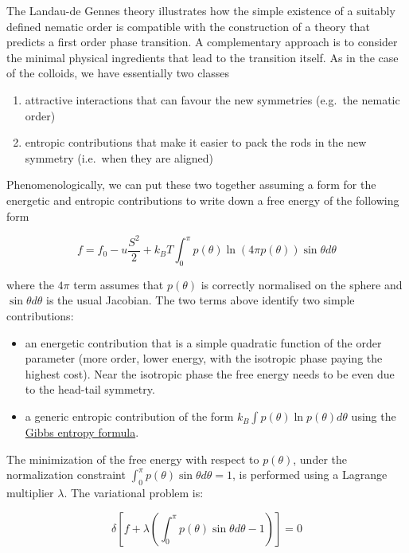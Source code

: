 \documentclass[
  letterpaper,
  enabledeprecatedfontcommands]{report}
\providecommand{\tightlist}{%
  \setlength{\itemsep}{0pt}\setlength{\parskip}{0pt}}
\begin{document}
The Landau-de Gennes theory illustrates how the simple existence of a
suitably defined nematic order is compatible with the construction of a
theory that predicts a first order phase transition. A complementary
approach is to consider the minimal physical ingredients that lead to
the transition itself. As in the case of the colloids, we have
essentially two classes

\begin{enumerate}
\def\labelenumi{\arabic{enumi}.}
\tightlist
\item
  attractive interactions that can favour the new symmetries (e.g.~the
  nematic order)
\item
  entropic contributions that make it easier to pack the rods in the new
  symmetry (i.e.~when they are aligned)
\end{enumerate}

Phenomenologically, we can put these two together assuming a form for
the energetic and entropic contributions to write down a free energy of
the following form

\[f = f_0 - u\dfrac{S^2}{2}+k_BT \int_0^\pi p(\theta) \ln (4\pi p(\theta)) \sin\theta d\theta\]

where the \(4\pi\) term assumes that \(p(\theta)\) is correctly
normalised on the sphere and \(\sin\theta d\theta\) is the usual
Jacobian. The two terms above identify two simple contributions:

\begin{itemize}
\tightlist
\item
  an energetic contribution that is a simple quadratic function of the
  order parameter (more order, lower energy, with the isotropic phase
  paying the highest cost). Near the isotropic phase the free energy
  needs to be even due to the head-tail symmetry.
\item
  a generic entropic contribution of the form
  \(k_B\int p(\theta)\ln p(\theta) d\theta\) using the
  \href{https://en.wikipedia.org/wiki/Entropy_(statistical_thermodynamics)\#Gibbs_entropy_formula}{Gibbs
  entropy formula}.
\end{itemize}

The minimization of the free energy with respect to \(p(\theta)\), under
the normalization constraint
\(\int_0^\pi p(\theta) \sin\theta d\theta = 1\), is performed using a
Lagrange multiplier \(\lambda\). The variational problem is:

\[
\delta \left[ f + \lambda \left( \int_0^\pi p(\theta) \sin\theta d\theta - 1 \right) \right] = 0
\]
\end{document}

